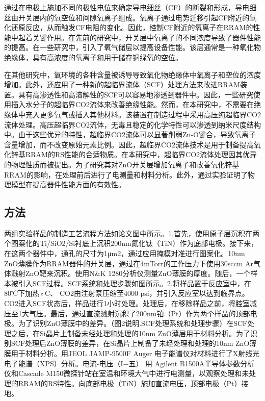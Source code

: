 通过在电极上施加不同的极性电位来确定导电细丝（CF）的断裂和形成，导电细丝由开关层内的氧空位和间隙氧离子组成。氧离子通过电势迁移引起CF附近的氧化还原反应，从而触发CF电阻的变化。因此，控制CF附近的氧离子在RRAM的性能中起着关键作用。在先前的研究中，开关层中氧离子的不同浓度导致了器件性能的提高。在一些研究中，引入了氧气储层以提高设备性能。该层通常是一种氧化物绝缘体，具有高浓度的氧离子和用于储存铜绿氧的空位。

在其他研究中，氧环境的各种含量被诱导导致氧化物绝缘体中氧离子和空位的浓度增加。此外，还应用了一种新的超临界流体（SCF）处理方法来改进RRAM装置。具有高渗透性和高溶解性的SCF可以容易地渗透到器件中。因此，一些研究使用插入水分子的超临界CO2流体来改善绝缘性能。然而，在本研究中，不需要在绝缘体中充入更多氧气或插入其他材料。该装置在制造过程中采用高压纯超临界CO2流体处理。高压超临界CO2流体，无毒且稳定的化学特性可以渗透到纳米尺度结构中。由于这些优异的特性，超临界CO2流体可以显著削弱Zn-O键合，导致氧离子含量增加，而不改变原始元素比例。因此，超临界CO2流体技术是用于制备提高氧化锌基RRAM的RS性能的合适物质。在本研究中，超临界CO2流体处理因其优异的物理性质而被提出。为了研究其对ZnO开关层增加氧离子和改善氧化锌基RRAM的影响，在处理前后进行了电测量和材料分析。此外，通过实验证明了物理模型在提高器件性能方面的有效性。


\subsection{方法}

两组实验样品的制造工艺流程方法如论文图中所示。1.首先，使用原子层沉积在两个图案化的Ti/SiO2/Si衬底上沉积200nm氮化钛（TiN）作为底部电极。接下来，在这两个器件中，通孔的尺寸为1μm2，通过应用掩模对准进行图案化。10nm ZnO薄膜作为RRAM器件的开关层，通过在4mTorr的工作压力下使用30sccm Ar气体溅射ZnO靶来沉积。使用N\&K 1280分析仪测量ZnO薄膜的厚度。随后，一个样本被引入SCF过程。SCF系统和处理步骤如图所示。2.将样品置于反应室中，在80℃下加热◦C、 CO2由注射泵压缩至4000 psi，并引入反应室以达到临界点。CO2进入SCF状态后，样品进行1小时处理。处理后，在移除样品之前，将腔室减压至1大气压。最后，通过直流溅射沉积了200nm铂（Pt）作为两个样品的顶部电极。为了识别ZnO薄膜中的差异。（图2说明.SCF处理系统和处理步骤）在SCF处理之后，在Si晶片上制备未经处理和处理的10nm ZnO薄层用于材料分析。为了识别SCF处理后ZnO薄膜的差异，在Si晶片上制备了未经处理和处理的10nm ZnO薄膜用于材料分析。用JEOL JAMP-9500F Auger 电子能谱仪对材料进行了X射线光电子能谱（XPS）分析。电流-电压（I−五） 用 Agilent B1500A半导体参数分析仪和Cascade M150微探针站在室温和环境大气中进行电测量，以观察处理和未处理的RRAM的RS特性。向底部电极（TiN）施加直流电压，顶部电极（Pt）接地。

